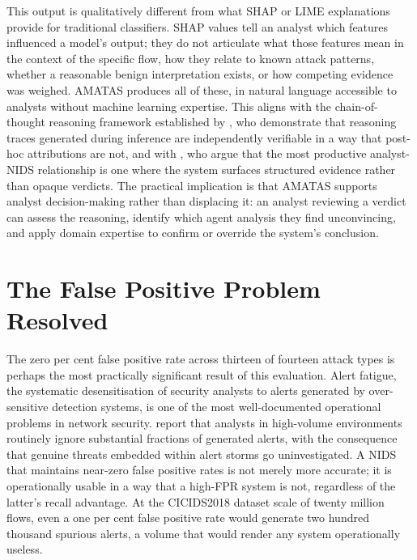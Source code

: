 This output is qualitatively different from what SHAP or LIME explanations provide for traditional classifiers. SHAP values tell an analyst which features influenced a model's output; they do not articulate what those features mean in the context of the specific flow, how they relate to known attack patterns, whether a reasonable benign interpretation exists, or how competing evidence was weighed. AMATAS produces all of these, in natural language accessible to analysts without machine learning expertise. This aligns with the chain-of-thought reasoning framework established by \textcite{Wei2022}, who demonstrate that reasoning traces generated during inference are independently verifiable in a way that post-hoc attributions are not, and with \textcite{Hesford2024}, who argue that the most productive analyst-NIDS relationship is one where the system surfaces structured evidence rather than opaque verdicts. The practical implication is that AMATAS supports analyst decision-making rather than displacing it: an analyst reviewing a verdict can assess the reasoning, identify which agent analysis they find unconvincing, and apply domain expertise to confirm or override the system's conclusion.

\section{The False Positive Problem Resolved}

The zero per cent false positive rate across thirteen of fourteen attack types is perhaps the most practically significant result of this evaluation. Alert fatigue, the systematic desensitisation of security analysts to alerts generated by over-sensitive detection systems, is one of the most well-documented operational problems in network security. \textcite{Alahmadi2020} report that analysts in high-volume environments routinely ignore substantial fractions of generated alerts, with the consequence that genuine threats embedded within alert storms go uninvestigated. A NIDS that maintains near-zero false positive rates is not merely more accurate; it is operationally usable in a way that a high-FPR system is not, regardless of the latter's recall advantage. At the CICIDS2018 dataset scale of twenty million flows, even a one per cent false positive rate would generate two hundred thousand spurious alerts, a volume that would render any system operationally useless.

